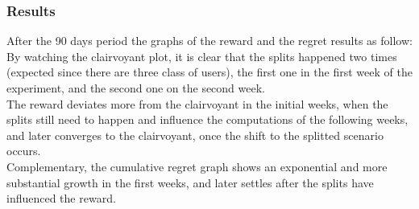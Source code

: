 \subsubsection{Results}
After the 90 days period the graphs of the reward and the regret results as follow:\\
By watching the clairvoyant plot, it is clear that the splits happened two times (expected since there are three class of users), the first one in the first week of the experiment, and the second one on the second week. \\The reward deviates more from the clairvoyant in the initial weeks, when the splits still need to happen and influence the computations of the following weeks, and later converges to the clairvoyant, once the shift to the splitted scenario occurs. \\Complementary, the cumulative regret graph shows an exponential and more substantial growth in the first weeks, and later settles after the splits have influenced the reward.